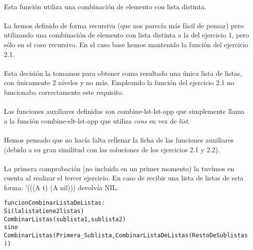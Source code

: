 \begin{aibox}{\comments}
\paragraph{}
Esta función utiliza una combinación de elemento con lista distinta. 
\paragraph{}
La hemos definido de forma recursiva (que nos parecía más fácil de pensar) pero utilizando una combinación de elemento con lista distinta a la del ejercicio 1, pero sólo en el caso recursivo. En el caso base hemos mantenido la función del ejercicio 2.1. 
\paragraph{}
Esta decisión la tomamos para obtener como resultado una única lista de listas, con únicamente 2 niveles y no más. Empleando la función del ejercicio 2.1 no funcionaba correctamente este requisito.
\paragraph{}
Las funciones auxiliares definidas son combine-lst-lst-app que simplemente llama a la función combine-elt-lst-app que utiliza \emph{cons} en vez de \emph{list}.
\paragraph{}
Hemos pensado que no hacía falta rellenar la ficha de las funciones auxiliares (debido a su gran similitud con las soluciones de los ejercicios 2.1 y 2.2).
\paragraph{}
La primera comprobación (no incluida en un primer momento) la tuvimos en cuenta al realizar el tercer ejercicio. En caso de recibir una lista de listas de esta forma: '(((A t) (A nil))) devolvía NIL.
\end{aibox}
\newpage
\begin{aibox}{\pseudocode}
\begin{alltt}
funcion CombinarListaDeListas:
    Si (la lista tiene 2 listas)
        CombinarListas(sublista1,sublista2)
    sino
        CombinarListas (Primera\_Sublista, CombinarListaDeListas (RestoDeSublistas))
\end{alltt}
\end{aibox}

